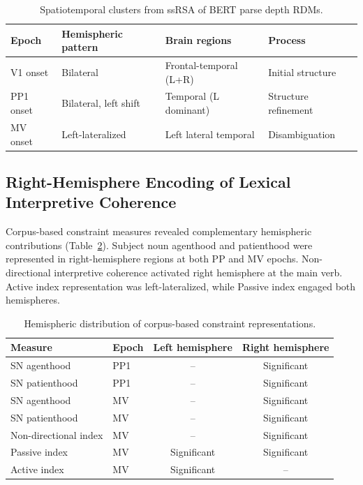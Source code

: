 \documentclass[11pt]{article}
\begin{document}
\begin{table}[H]
\centering
\caption{Spatiotemporal clusters from ssRSA of BERT parse depth RDMs.}
\label{tab:neural}
\begin{tabular}{llll}
\toprule
\textbf{Epoch} & \textbf{Hemispheric pattern} & \textbf{Brain regions} & \textbf{Process} \\
\midrule
V1 onset & Bilateral & Frontal-temporal (L+R) & Initial structure \\
PP1 onset & Bilateral, left shift & Temporal (L dominant) & Structure refinement \\
MV onset & Left-lateralized & Left lateral temporal & Disambiguation \\
\bottomrule
\end{tabular}
\end{table}

\subsection{Right-Hemisphere Encoding of Lexical Interpretive Coherence}

Corpus-based constraint measures revealed complementary hemispheric contributions (Table~\ref{tab:hemispheres}). Subject noun agenthood and patienthood were represented in right-hemisphere regions at both PP and MV epochs. Non-directional interpretive coherence activated right hemisphere at the main verb. Active index representation was left-lateralized, while Passive index engaged both hemispheres.

\begin{table}[H]
\centering
\caption{Hemispheric distribution of corpus-based constraint representations.}
\label{tab:hemispheres}
\begin{tabular}{llcc}
\toprule
\textbf{Measure} & \textbf{Epoch} & \textbf{Left hemisphere} & \textbf{Right hemisphere} \\
\midrule
SN agenthood & PP1 & -- & Significant \\
SN patienthood & PP1 & -- & Significant \\
SN agenthood & MV & -- & Significant \\
SN patienthood & MV & -- & Significant \\
Non-directional index & MV & -- & Significant \\
Passive index & MV & Significant & Significant \\
Active index & MV & Significant & -- \\
\bottomrule
\end{tabular}
\end{table}
\end{document}
